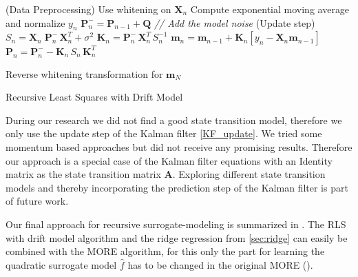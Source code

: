 \begin{algorithm}[h]
\renewcommand{\algorithmcfname}{Algorithm}
\DontPrintSemicolon
\SetAlgoLined
{}

{
  \Begin(Data Preprocessing)
  {
  Use whitening on $\mathbf{X}_n$\;
  Compute exponential moving average and normalize $y_n$ \;
  }
  $\mathbf{P}_n^- = \mathbf{P}_{n-1} + \mathbf{Q}$
  \textit{  // Add the model noise}\;
  \Begin(Update step)
  {
    $S_n = \mathbf{X}_n \; \mathbf{P}_n^- \, \mathbf{X}_n^T + \sigma^2$ \;
    $\textbf{K}_n = \textbf{P}_{n}^{-} \, \textbf{X}^T_n \, S_n^{-1}$ \;
    $\textbf{m}_n = \textbf{m}_{n-1} + \textbf{K}_n [y_n - \textbf{X}_n \textbf{m}_{n-1}]$ \;
    $\textbf{P}_n = \textbf{P}_{n}^{-} - \textbf{K}_n \, S_n \, \textbf{K}_n^T $ \;
  }

}
Reverse whitening transformation for $\mathbf{m}_N$ \;
\caption{Recursive Least Squares with Drift Model}
\label{RLS:basic}
\end{algorithm}

During our research we did not find a good state transition model, therefore
we only use the update step of the Kalman filter \cref{KF_update}.
We tried some momentum based approaches but
did not receive any promising results. 
Therefore our approach is a special case of the Kalman filter
equations with
an Identity matrix as the state transition matrix $\mathbf{A}$.
Exploring different state transition models and thereby incorporating
the prediction step of the Kalman filter is part of future work.

Our final approach for recursive surrogate-modeling is summarized
in .
The RLS with drift model algorithm and the ridge regression
from \cref{sec:ridge} can easily be combined with the MORE algorithm,
for this only the part for learning the quadratic 
surrogate model $\hat{f}$ has to be changed in the original MORE
().


